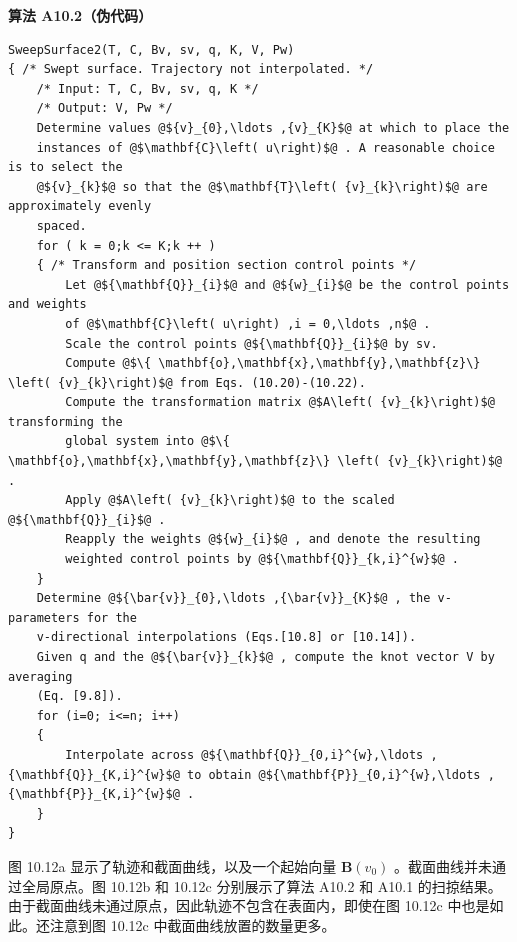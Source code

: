 \documentclass[../main.tex]{subfiles}
\begin{document}
\par\medskip\noindent\textbf{算法 A10.2（伪代码）}\par
\begin{verbatim}
SweepSurface2(T, C, Bv, sv, q, K, V, Pw)
{ /* Swept surface. Trajectory not interpolated. */
    /* Input: T, C, Bv, sv, q, K */
    /* Output: V, Pw */
    Determine values @${v}_{0},\ldots ,{v}_{K}$@ at which to place the
    instances of @$\mathbf{C}\left( u\right)$@ . A reasonable choice is to select the
    @${v}_{k}$@ so that the @$\mathbf{T}\left( {v}_{k}\right)$@ are approximately evenly
    spaced.
    for ( k = 0;k <= K;k ++ )
    { /* Transform and position section control points */
        Let @${\mathbf{Q}}_{i}$@ and @${w}_{i}$@ be the control points and weights
        of @$\mathbf{C}\left( u\right) ,i = 0,\ldots ,n$@ .
        Scale the control points @${\mathbf{Q}}_{i}$@ by sv.
        Compute @$\{ \mathbf{o},\mathbf{x},\mathbf{y},\mathbf{z}\} \left( {v}_{k}\right)$@ from Eqs. (10.20)-(10.22).
        Compute the transformation matrix @$A\left( {v}_{k}\right)$@ transforming the
        global system into @$\{ \mathbf{o},\mathbf{x},\mathbf{y},\mathbf{z}\} \left( {v}_{k}\right)$@ .
        Apply @$A\left( {v}_{k}\right)$@ to the scaled @${\mathbf{Q}}_{i}$@ .
        Reapply the weights @${w}_{i}$@ , and denote the resulting
        weighted control points by @${\mathbf{Q}}_{k,i}^{w}$@ .
    }
    Determine @${\bar{v}}_{0},\ldots ,{\bar{v}}_{K}$@ , the v-parameters for the
    v-directional interpolations (Eqs.[10.8] or [10.14]).
    Given q and the @${\bar{v}}_{k}$@ , compute the knot vector V by averaging
    (Eq. [9.8]).
    for (i=0; i<=n; i++)
    {
        Interpolate across @${\mathbf{Q}}_{0,i}^{w},\ldots ,{\mathbf{Q}}_{K,i}^{w}$@ to obtain @${\mathbf{P}}_{0,i}^{w},\ldots ,{\mathbf{P}}_{K,i}^{w}$@ .
    }
}
\end{verbatim}

图 10.12a 显示了轨迹和截面曲线，以及一个起始向量 \(\mathbf{B}\left( {v}_{0}\right)\) 。截面曲线并未通过全局原点。图 10.12b 和 10.12c 分别展示了算法 A10.2 和 A10.1 的扫掠结果。由于截面曲线未通过原点，因此轨迹不包含在表面内，即使在图 10.12c 中也是如此。还注意到图 10.12c 中截面曲线放置的数量更多。
\end{document}

